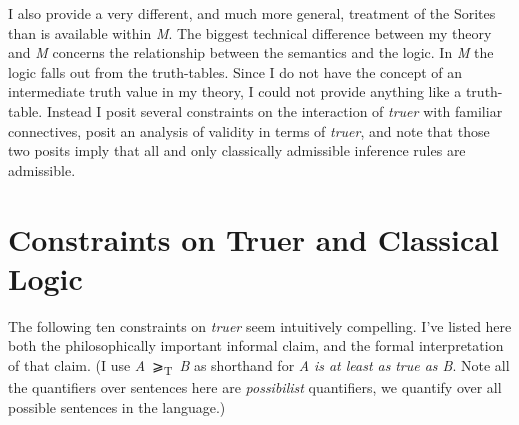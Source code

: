 \documentclass[
  11pt,
  letterpaper,
  DIV=11,
  numbers=noendperiod,
  twoside]{scrartcl}
\begin{document}
I also provide a very different, and much more general, treatment of the
Sorites than is available within \emph{M}. The biggest technical
difference between my theory and \emph{M} concerns the relationship
between the semantics and the logic. In \emph{M} the logic falls out
from the truth-tables. Since I do not have the concept of an
intermediate truth value in my theory, I could not provide anything like
a truth-table. Instead I posit several constraints on the interaction of
\emph{truer} with familiar connectives, posit an analysis of validity in
terms of \emph{truer}, and note that those two posits imply that all and
only classically admissible inference rules are admissible.

\section{Constraints on Truer and Classical
Logic}\label{constraints-on-truer-and-classical-logic}

The following ten constraints on \emph{truer} seem intuitively
compelling. I've listed here both the philosophically important informal
claim, and the formal interpretation of that claim. (I use
\emph{A}~⩾\textsubscript{T}~\emph{B} as shorthand for \emph{A} \emph{is
at least as} \emph{true as B}. Note all the quantifiers over sentences
here are \emph{possibilist} quantifiers, we quantify over all possible
sentences in the language.)
\end{document}
